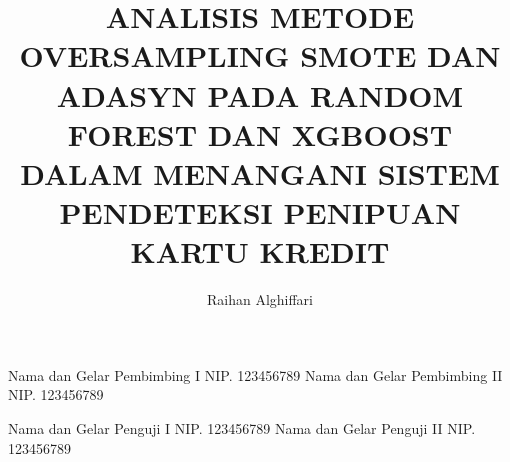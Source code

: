 \documentclass[12pt, a4paper, onecolumn, oneside, final]{report}
\begin{document}

    
    \title{ANALISIS METODE OVERSAMPLING SMOTE DAN ADASYN PADA RANDOM FOREST DAN XGBOOST DALAM MENANGANI SISTEM PENDETEKSI PENIPUAN KARTU KREDIT} 	
    
    \author{Raihan Alghiffari}		%
	
	\dosbingA%
		{Nama dan Gelar Pembimbing I}%
		{NIP. 123456789}				%
	\dosbingB%
		{Nama dan Gelar Pembimbing II}%
		{NIP. 123456789}				%
		
	\pengujiA%
		{Nama dan Gelar Penguji I}%
		{NIP. 123456789}				%
	\pengujiB%
		{Nama dan Gelar Penguji II}%
		{NIP. 123456789}				%

	\sloppy %
    \setcounter{page}{1} %

    
%    
%    

\renewcommand{\contentsname}{\LARGE Daftar Isi}
\renewcommand{\listtablename}{\LARGE Daftar Tabel}
\renewcommand{\listfigurename}{\LARGE Daftar Gambar}
\end{document}
